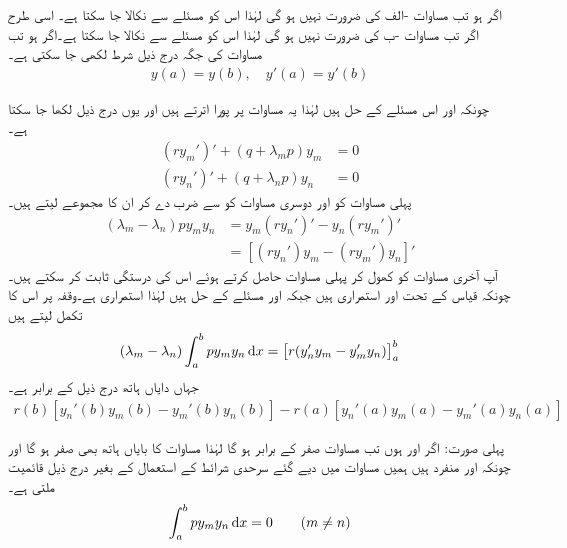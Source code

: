اگر  ہو تب مساوات -الف کی ضرورت نہیں ہو گی لہٰذا اس کو مسئلے سے نکالا جا سکتا ہے۔ اسی طرح اگر  تب مساوات -ب کی ضرورت نہیں ہو گی لہٰذا اس کو مسئلے سے نکالا جا سکتا ہے۔اگر  ہو تب مساوات  کی جگہ درج ذیل شرط لکھی جا سکتی ہے۔
\begin{align}\label{مساوات_طاقتی_تسلسل_ثبوت_عمودیت_الف}
y(a)=y(b),\quad y'(a)=y'(b)
\end{align}

چونکہ  اور  اس مسئلے کے حل ہیں لہٰذا یہ مساوات  پر پورا اترتے ہیں اور یوں درج ذیل لکھا جا سکتا ہے۔
\begin{align*}
(ry_m')'+(q+\lambda_m p)y_m&=0\\
(ry_n')'+(q+\lambda_n p)y_n&=0
\end{align*}
پہلی مساوات کو  اور دوسری مساوات کو  سے ضرب دے کر ان کا مجموعے لیتے ہیں۔
\begin{align*}
(\lambda_m-\lambda_n)p y_my_n&=y_m(ry_n')'-y_n(ry_m')'\\
&=[(ry_n')y_m-(ry_m')y_n]'
\end{align*}
آپ آخری مساوات  کو کھول کر پہلی مساوات حاصل کرتے ہوئے اس کی درستگی ثابت کر سکتے ہیں۔چونکہ قیاس کے تحت  اور  استمراری ہیں جبکہ  اور  مسئلے کے حل ہیں لہٰذا  استمراری ہے۔وقفہ  پر اس کا تکمل لیتے ہیں
\begin{align}\label{مساوات_طاقتی_تسلسل_ثبوت_عمودیت_ب}
(\lambda_m-\lambda_n)\int_a^b py_my_n\dif x=\left[r(y_n'y_m-y_m'y_n)\right]_a^b
\end{align}
جہاں دایاں ہاتھ درج ذیل کے برابر ہے۔
\begin{align}\label{مساوات_طاقتی_تسلسل_ثبوت_عمودیت_پ}
r(b)[y_n'(b)y_m(b)-y_m'(b)y_n(b)]-r(a)[y_n'(a)y_m(a)-y_m'(a)y_n(a)]
\end{align}

پہلی صورت: اگر  اور  ہوں تب  مساوات  صفر کے برابر ہو گا لہٰذا مساوات  کا بایاں ہاتھ بھی صفر ہو گا اور چونکہ  اور  منفرد ہیں ہمیں مساوات  میں دیے گئے سرحدی شرائط کے استعمال کے بغیر درج ذیل قائمیت ملتی ہے۔
\begin{align}\label{مساوات_طاقتی_تسلسل_ثبوت_عمودیت_ت}
\int_a^b py_my_n\dif x=0\quad \quad (m\ne n)
\end{align} 

